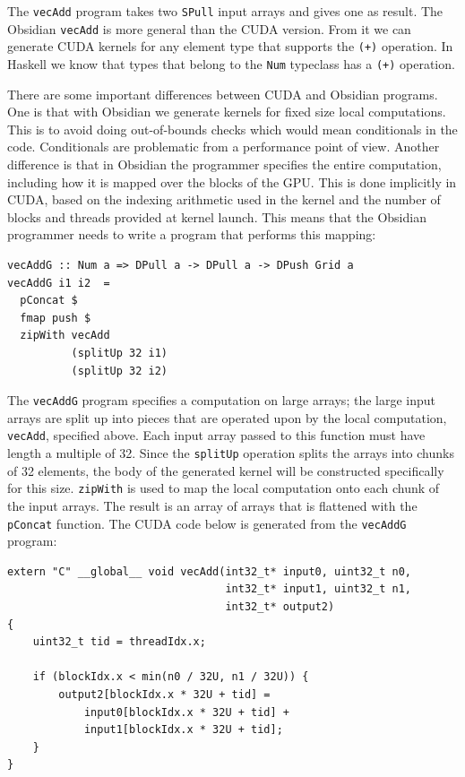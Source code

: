 \documentclass[a4paper]{book}
\begin{document}
\noindent The {\tt vecAdd} program takes two {\tt SPull} input arrays and gives one 
as result. The Obsidian {\tt vecAdd} is more general than the CUDA version. From it 
we can generate CUDA kernels for any element type that supports the {\tt (+)} operation. 
In Haskell we know that types that belong to the {\tt Num} typeclass has a {\tt (+)} operation.  

There are some important differences between CUDA and Obsidian programs. One is that with Obsidian 
we generate kernels for fixed size local computations. This is to avoid doing out-of-bounds checks 
which would mean conditionals in the code. Conditionals are problematic from a performance 
point of view. Another difference is that in Obsidian the programmer specifies the entire 
computation, including how it is mapped over the blocks of the GPU. This is done implicitly 
in CUDA, based on the indexing arithmetic used in the kernel and the number of blocks and 
threads provided at kernel launch. This means that the Obsidian programmer needs to 
write a program that performs this mapping: 

\begin{small} 
\begin{Verbatim}[samepage=true]
vecAddG :: Num a => DPull a -> DPull a -> DPush Grid a
vecAddG i1 i2  =
  pConcat $
  fmap push $ 
  zipWith vecAdd
          (splitUp 32 i1)
          (splitUp 32 i2)  
\end{Verbatim}
\end{small} 

The {\tt vecAddG} program specifies a computation on large arrays; the large input arrays 
are split up into pieces that are operated upon by the local computation, {\tt vecAdd}, 
specified above. Each input array passed to this function must have length a multiple of 32.
Since the {\tt splitUp} operation splits the arrays into chunks of 32 elements, the body 
of the generated kernel will be constructed specifically for this size. {\tt zipWith} is 
used to map the local computation onto each chunk of the input arrays. The result is an 
array of arrays that is flattened with the {\tt pConcat} function. The CUDA code below 
is generated from the {\tt vecAddG} program: 

\begin{small}
\begin{Verbatim}[samepage=true] 
extern "C" __global__ void vecAdd(int32_t* input0, uint32_t n0,
                                  int32_t* input1, uint32_t n1,
                                  int32_t* output2)
{
    uint32_t tid = threadIdx.x;
    
    if (blockIdx.x < min(n0 / 32U, n1 / 32U)) {
        output2[blockIdx.x * 32U + tid] = 
            input0[blockIdx.x * 32U + tid] +
            input1[blockIdx.x * 32U + tid];
    }
}
\end{Verbatim}
\end{small} 
\end{document}
